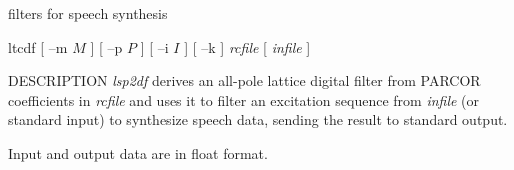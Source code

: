 % 
% 
% 
% 
%                                                                        
%
%
{filters for speech synthesis}

\begin{synopsis}
\item [ltcdf] [ --m $M$ ] [ --p $P$ ] [ --i $I$ ] [ --k ] {\em rcfile} 
	      [ {\em infile} ] 
\end{synopsis}

\begin{qsection}{DESCRIPTION}
{\em lsp2df} derives an all-pole lattice digital filter 
from PARCOR coefficients in {\em rcfile} 
and uses it to filter an excitation sequence
from {\em infile} (or standard input) to synthesize speech data, 
sending the result to standard output.

Input and output data are in float format.
\end{qsection}


